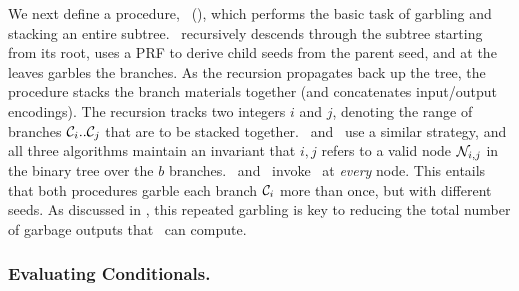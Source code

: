 We next define a procedure, \gbtree~(),
which performs the basic task of garbling and stacking an entire
subtree.
%
\gbtree\ recursively descends through the
subtree starting from its root, uses a PRF to derive child seeds from the parent seed, and at the
leaves garbles the branches.
As the recursion propagates back up the tree, the procedure stacks the
branch materials together (and concatenates input/output encodings).
%
The recursion tracks two integers $i$ and
$j$, denoting the range of branches $\mathcal C_i..\mathcal C_j$ that are to
be stacked together.
\evcond\ and \gbcond\ use a similar strategy, and all three algorithms
maintain an invariant that $i,j$ refers to a valid node $\mathtt{\cal N}_{i,j}$ in the binary
tree over the $b$ branches.
%
\evcond\ and \gbcond\ invoke \gbtree\ at
\emph{every} node. This entails that both procedures garble
each branch $\mathcal C_i$ more than once, but with different seeds.
As discussed in , this repeated garbling is key
to reducing the total number of garbage outputs that \E\
can compute.


\subsubsection{Evaluating Conditionals.}

